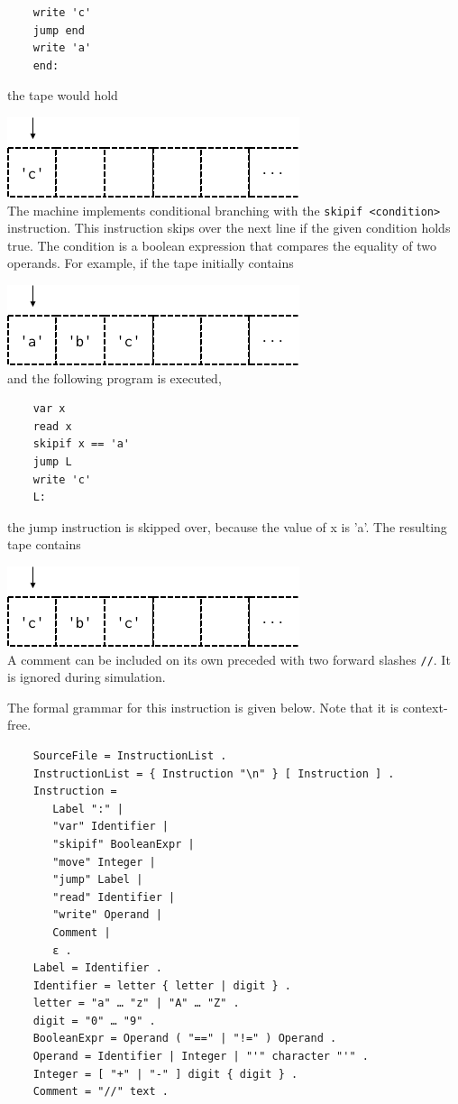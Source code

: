 \documentclass[10pt]{article}
\begin{document}
\begin{verbatim}
    write 'c'
    jump end
    write 'a'
    end:
\end{verbatim}
the tape would hold\par
\includegraphics[scale=.5]{tm3}\\
The machine implements conditional branching with the \texttt{skipif <condition>} instruction. This instruction skips over the next line if the given condition holds true. The condition is a boolean expression that compares the equality of two operands. For example, if the tape initially contains\par
\includegraphics[scale=.5]{tm4}\\
and the following program is executed,\par
\begin{verbatim}
    var x
    read x
    skipif x == 'a'
    jump L
    write 'c'
    L:
\end{verbatim}
the jump instruction is skipped over, because the value of x is 'a'. The resulting tape contains\par
\includegraphics[scale=.5]{tm5}\\
A comment can be included on its own preceded with two forward slashes \texttt{//}. It is ignored during simulation.\par
The formal grammar for this instruction is given below. Note that it is context-free.\par
\begin{verbatim}
    SourceFile = InstructionList .
    InstructionList = { Instruction "\n" } [ Instruction ] .
    Instruction =
       Label ":" |
       "var" Identifier |
       "skipif" BooleanExpr |
       "move" Integer |
       "jump" Label |
       "read" Identifier |
       "write" Operand |
       Comment |
       ε .
    Label = Identifier .
    Identifier = letter { letter | digit } .
    letter = "a" … "z" | "A" … "Z" .
    digit = "0" … "9" .
    BooleanExpr = Operand ( "==" | "!=" ) Operand .
    Operand = Identifier | Integer | "'" character "'" .
    Integer = [ "+" | "-" ] digit { digit } .
    Comment = "//" text .
\end{verbatim}
\end{document}

